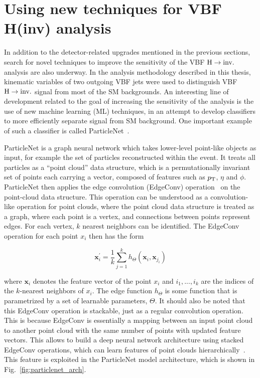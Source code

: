 \section{Using new techniques for VBF H(inv) analysis}

\graphicspath{{5_Outlook/Figures}}

In addition to the detector-related upgrades mentioned in the previous sections, search for novel techniques
to improve the sensitivity of the VBF $\textrm{H} \rightarrow \textrm{inv.}$ analysis are also underway. In the analysis methodology described
in this thesis, kinematic variables of two outgoing VBF jets were used to distinguish VBF $\textrm{H} \rightarrow \textrm{inv.}$ signal from
most of the SM backgrounds. An interesting line of development related to the goal of increasing the sensitivity 
of the analysis is the use of new machine learning (ML) techniques, in an attempt to develop classifiers to
more efficiently separate signal from SM background. One important example of such a classifier is called
ParticleNet~\cite{CMS:ParticleNetPaper}. 

ParticleNet is a graph neural network which takes lower-level point-like
objects as input, for example the set of particles reconstructed within the event. It treats all particles
as a ``point cloud'' data structure, which is a permutationally invariant set of points each carrying a
vector, composed of features such as $p_{\textrm{T}}$, $\eta$ and $\phi$. ParticleNet then applies the edge convolution
(EdgeConv) operation~\cite{Wang:DynamicGraphCNNPaper} on the point-cloud data structure. This operation can be
understood as a convolution-like operation for point clouds, where the point cloud data structure is treated as
a graph, where each point is a vertex, and connections between points represent edges. For each vertex, $k$
nearest neighbors can be identified. The EdgeConv operation for each point $x_{i}$ then has the form

\begin{equation}
    \mathbf{x}_i^{'} = \frac{1}{k} \sum_{j=1}^{k} h_{\Theta}(\mathbf{x}_i, \mathbf{x}_{j_i})
\end{equation}

where $\mathbf{x}_i$ denotes the feature vector of the point $x_i$ and ${i_1,...,i_k}$ are the indices of the 
$k$-nearest neighbors of $x_i$. The edge function $h_{\Theta}$ is some function that is parametrized by
a set of learnable parameters, $\Theta$. It should also be noted that this EdgeConv operation is stackable,
just as a regular convolution operation. This is because EdgeConv is essentially a mapping between an input
point cloud to another point cloud with the same number of points with updated feature vectors. 
This allows to build a deep neural network architecture 
using stacked EdgeConv operations, which can learn features of point clouds 
hierarchically~\cite{CMS:ParticleNetPaper}. 
This feature is exploited in the ParticleNet model architecture, which is shown in Fig.~\ref{fig:particlenet_arch}.

